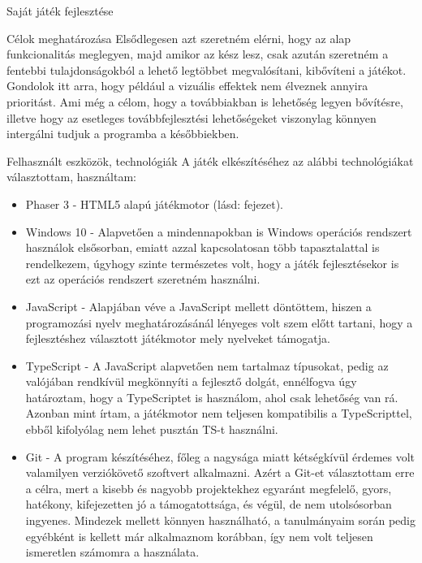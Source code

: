\begin{MyChapter}{Saját játék fejlesztése}
\begin{MySection}{Célok meghatározása}
		Elsődlegesen azt szeretném elérni, hogy az alap funkcionalitás meglegyen, majd amikor az kész lesz, csak azután szeretném a fentebbi tulajdonságokból a lehető legtöbbet megvalósítani, kibővíteni a játékot. Gondolok itt arra, hogy például a vizuális effektek nem élveznek annyira prioritást. Ami még a célom, hogy a továbbiakban is lehetőség legyen bővítésre, illetve hogy az esetleges továbbfejlesztési lehetőségeket viszonylag könnyen intergálni tudjuk a programba a későbbiekben.
	\end{MySection}
		
	\begin{MySection}{Felhasznált eszközök, technológiák}
		A játék elkészítéséhez az alábbi technológiákat választottam, használtam:
		
		\begin{itemize}
			\item Phaser 3 - HTML5 alapú játékmotor (lásd:  fejezet).
			
			\item Windows 10 - Alapvetően a mindennapokban is Windows operációs rendszert használok elsősorban, emiatt azzal kapcsolatosan több tapasztalattal is rendelkezem, úgyhogy szinte természetes volt, hogy a játék fejlesztésekor is ezt az operációs rendszert szeretném használni.
			
			\item JavaScript - Alapjában véve a JavaScript mellett döntöttem, hiszen a programozási nyelv meghatározásánál lényeges volt szem előtt tartani, hogy a fejlesztéshez választott játékmotor mely nyelveket támogatja.
			
			\item TypeScript - A JavaScript alapvetően nem tartalmaz típusokat, pedig az valójában rendkívül megkönnyíti a fejlesztő dolgát, ennélfogva úgy határoztam, hogy a TypeScriptet is használom, ahol csak lehetőség van rá. Azonban mint írtam, a játékmotor nem teljesen kompatibilis a TypeScripttel, ebből kifolyólag nem lehet pusztán TS-t használni.
			
			\item Git - A program készítéséhez, főleg a nagysága miatt kétségkívül érdemes volt valamilyen verziókövető szoftvert alkalmazni. Azért a Git-et választottam erre a célra, mert a kisebb és nagyobb projektekhez egyaránt megfelelő, gyors, hatékony, kifejezetten jó a támogatottsága, és végül, de nem utolsósorban ingyenes. Mindezek mellett könnyen használható, a tanulmányaim során pedig egyébként is kellett már alkalmaznom korábban, így nem volt teljesen ismeretlen számomra a használata.
			

\end{itemize}
\end{MySection}
\end{MyChapter}
